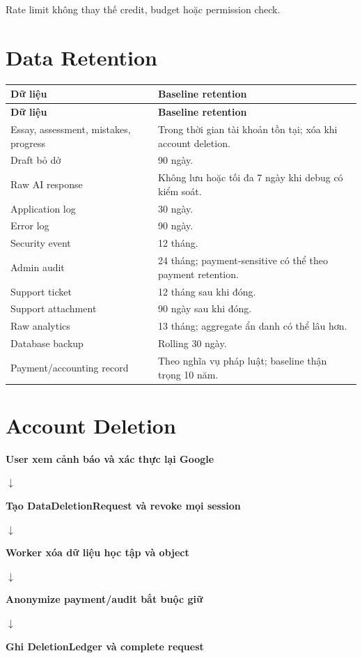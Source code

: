 \documentclass[11pt,a4paper]{article}
\newcommand{\flowarrow}{\par\centering\sffamily\color{BandBlue}\Large$\downarrow$\par}
\newcommand{\flowstep}[1]{\par\centering\sffamily\bfseries #1\par}
\begin{document}
Rate limit không thay thế credit, budget hoặc permission check.

\section{Data Retention}

\begin{longtable}{|P{0.37\textwidth}|P{0.44\textwidth}|}
\hline
\textbf{Dữ liệu} & \textbf{Baseline retention} \\ \hline
\endfirsthead
\hline
\textbf{Dữ liệu} & \textbf{Baseline retention} \\ \hline
\endhead
Essay, assessment, mistakes, progress & Trong thời gian tài khoản tồn tại; xóa khi account deletion. \\ \hline
Draft bỏ dở & 90 ngày. \\ \hline
Raw AI response & Không lưu hoặc tối đa 7 ngày khi debug có kiểm soát. \\ \hline
Application log & 30 ngày. \\ \hline
Error log & 90 ngày. \\ \hline
Security event & 12 tháng. \\ \hline
Admin audit & 24 tháng; payment-sensitive có thể theo payment retention. \\ \hline
Support ticket & 12 tháng sau khi đóng. \\ \hline
Support attachment & 90 ngày sau khi đóng. \\ \hline
Raw analytics & 13 tháng; aggregate ẩn danh có thể lâu hơn. \\ \hline
Database backup & Rolling 30 ngày. \\ \hline
Payment/accounting record & Theo nghĩa vụ pháp luật; baseline thận trọng 10 năm. \\ \hline
\end{longtable}

\section{Account Deletion}

\begin{flowbox}
\flowstep{User xem cảnh báo và xác thực lại Google}
\flowarrow
\flowstep{Tạo DataDeletionRequest và revoke mọi session}
\flowarrow
\flowstep{Worker xóa dữ liệu học tập và object}
\flowarrow
\flowstep{Anonymize payment/audit bắt buộc giữ}
\flowarrow
\flowstep{Ghi DeletionLedger và complete request}
\end{flowbox}
\end{document}
